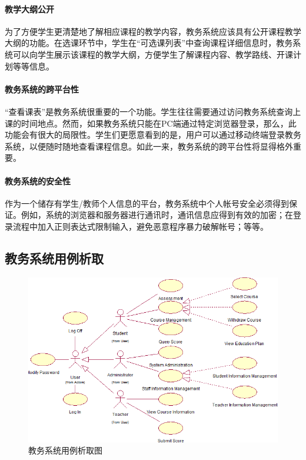 \paragraph{教学大纲公开}

为了方便学生更清楚地了解相应课程的教学内容，教务系统应该具有公开课程教学大纲的功能。在选课环节中，学生在“可选课列表”中查询课程详细信息时，教务系统可以向学生展示该课程的教学大纲，方便学生了解课程内容、教学路线、开课计划等等信息。
    
\paragraph{教务系统的跨平台性}
    
“查看课表”是教务系统很重要的一个功能。学生往往需要通过访问教务系统查询上课的时间地点。然而，如果教务系统只能在PC端通过特定浏览器登录，那么，此功能会有很大的局限性。学生们更愿意看到的是，用户可以通过移动终端登录教务系统，以便随时随地查看课程信息。如此一来，教务系统的跨平台性将显得格外重要。
    
\paragraph{教务系统的安全性}
    
作为一个储存有学生/教师个人信息的平台，教务系统中个人帐号安全必须得到保证。例如，系统的浏览器和服务器进行通讯时，通讯信息应得到有效的加密；在登录流程中加入正则表达式限制输入，避免恶意程序暴力破解帐号；等等。

\subsection{教务系统用例析取}
\begin{figure}[H]
   \centering \includegraphics[width=\textwidth]{img/jwxt_usecases.png}
   \caption{教务系统用例析取图}
\end{figure}

